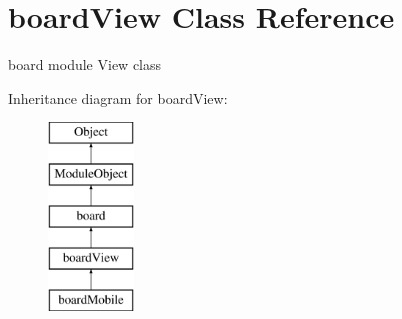 \hypertarget{classboardView}{\section{board\+View Class Reference}
\label{classboardView}
}


board module View class  


Inheritance diagram for board\+View\+:\begin{figure}[H]
\begin{center}
\leavevmode
\includegraphics[height=5.000000cm]{classboardView}
\end{center}
\end{figure}
